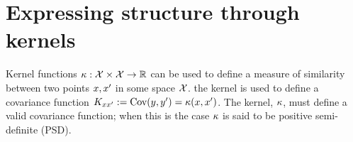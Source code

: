 \documentclass[twoside]{article}
\begin{document}




\section{Expressing structure through kernels}
\label{sec:Structure}

Kernel functions $\kappa : \mathcal{X} \times \mathcal{X} \to \mathbb{R}$ can be used to define a measure of similarity between two points $x, x'$ in some space $\mathcal{X}$.
 the kernel is used to define a covariance function ${K_{x x'} := \textrm{Cov}(y, y') = \kappa(x,x')}$.
The kernel, $\kappa$, must define a valid covariance function; when this is the case $\kappa$ is said to be positive semi-definite (PSD).
\end{document}
